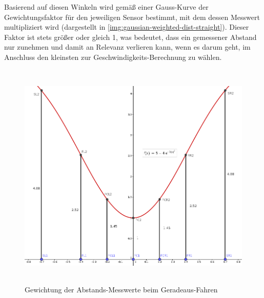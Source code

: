 \documentclass[12pt, a4paper]{scrartcl}
\begin{document}
Basierend auf diesen Winkeln wird gemäß einer Gauss-Kurve der Gewichtungsfaktor für den jeweiligen Sensor bestimmt, mit dem dessen Messwert multipliziert wird (dargestellt in \autoref{img:gaussian-weighted-dist-straight}). Dieser Faktor ist stets größer oder gleich 1, was bedeutet, dass ein gemessener Abstand nur zunehmen und damit an Relevanz verlieren kann, wenn es darum geht, im Anschluss den kleinsten zur Geschwindigkeits-Berechnung zu wählen.

\begin{figure}[!ht]
	\centering
	\includegraphics[width=\textwidth, height=11cm, keepaspectratio]{Bilder/Gauss_Sensorgewichtung_gerade.png}
	\caption{Gewichtung der Abstands-Messwerte beim Geradeaus-Fahren}
	\label{img:gaussian-weighted-dist-straight}
\end{figure}
\end{document}

